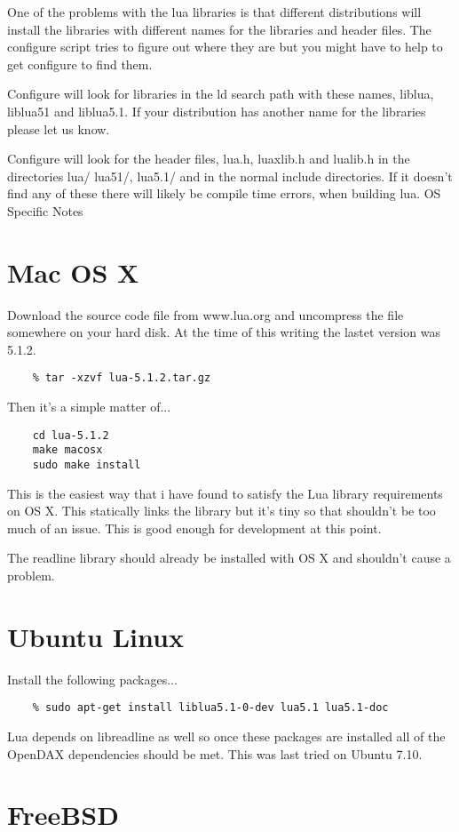 \documentclass[letterpaper,10pt]{book}
\begin{document}
One of the problems with the lua libraries is that different distributions will install the libraries with different names for the libraries and header files. The configure script tries to figure out where they are but you might have to help to get configure to find them.

Configure will look for libraries in the ld search path with these names, liblua, liblua51 and liblua5.1. If your distribution has another name for the libraries please let us know.

Configure will look for the header files, lua.h, luaxlib.h and lualib.h in the directories lua/ lua51/, lua5.1/ and in the normal include directories. If it doesn't find any of these there will likely be compile time errors, when building lua.
OS Specific Notes
\section*{Mac OS X}
Download the source code file from www.lua.org and uncompress the file somewhere on your hard disk. At the time of this writing the lastet version was 5.1.2.
\begin{verbatim}
    % tar -xzvf lua-5.1.2.tar.gz
\end{verbatim}

Then it's a simple matter of...
\begin{verbatim}
    cd lua-5.1.2
    make macosx
    sudo make install
\end{verbatim}

This is the easiest way that i have found to satisfy the Lua library requirements on OS X. This statically links the library but it's tiny so that shouldn't be too much of an issue. This is good enough for development at this point.

The readline library should already be installed with OS X and shouldn't cause a problem.
\section*{Ubuntu Linux}

Install the following packages...
\begin{verbatim}
    % sudo apt-get install liblua5.1-0-dev lua5.1 lua5.1-doc
\end{verbatim}
Lua depends on libreadline as well so once these packages are installed all of the OpenDAX dependencies should be met. This was last tried on Ubuntu 7.10.
\section*{FreeBSD}
\end{document}
